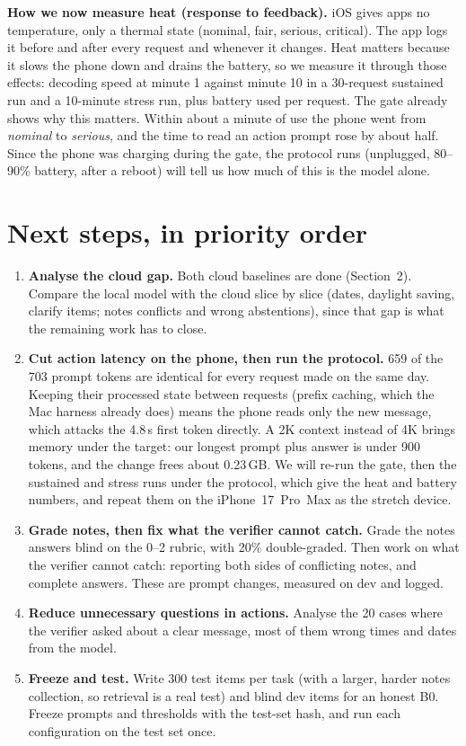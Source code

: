 \documentclass[10pt,letterpaper]{article}
\begin{document}
\textbf{How we now measure heat (response to feedback).} iOS gives apps no temperature, only a thermal state (nominal, fair, serious, critical). The app logs it before and after every request and whenever it changes. Heat matters because it slows the phone down and drains the battery, so we measure it through those effects: decoding speed at minute 1 against minute 10 in a 30-request sustained run and a 10-minute stress run, plus battery used per request. The gate already shows why this matters. Within about a minute of use the phone went from \emph{nominal} to \emph{serious}, and the time to read an action prompt rose by about half. Since the phone was charging during the gate, the protocol runs (unplugged, 80--90\% battery, after a reboot) will tell us how much of this is the model alone.

\section{Next steps, in priority order}
\begin{enumerate}
  \item \textbf{Analyse the cloud gap.} Both cloud baselines are done (Section~2). Compare the local model with the cloud slice by slice (dates, daylight saving, clarify items; notes conflicts and wrong abstentions), since that gap is what the remaining work has to close.
  \item \textbf{Cut action latency on the phone, then run the protocol.} 659 of the 703 prompt tokens are identical for every request made on the same day. Keeping their processed state between requests (prefix caching, which the Mac harness already does) means the phone reads only the new message, which attacks the 4.8\,s first token directly. A 2K context instead of 4K brings memory under the target: our longest prompt plus answer is under 900 tokens, and the change frees about 0.23\,GB. We will re-run the gate, then the sustained and stress runs under the protocol, which give the heat and battery numbers, and repeat them on the iPhone~17~Pro~Max as the stretch device.
  \item \textbf{Grade notes, then fix what the verifier cannot catch.} Grade the notes answers blind on the 0--2 rubric, with 20\% double-graded. Then work on what the verifier cannot catch: reporting both sides of conflicting notes, and complete answers. These are prompt changes, measured on dev and logged.
  \item \textbf{Reduce unnecessary questions in actions.} Analyse the 20 cases where the verifier asked about a clear message, most of them wrong times and dates from the model.
  \item \textbf{Freeze and test.} Write 300 test items per task (with a larger, harder notes collection, so retrieval is a real test) and blind dev items for an honest B0. Freeze prompts and thresholds with the test-set hash, and run each configuration on the test set once.
\end{enumerate}
\end{document}
